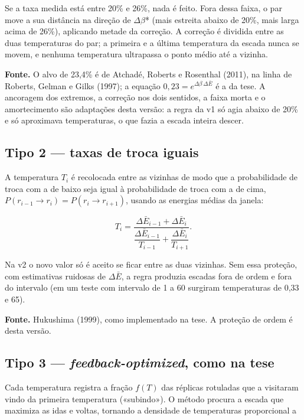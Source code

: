 \documentclass[10pt,a4paper]{article}
\begin{document}
Se a taxa medida está entre 20\% e 26\%, nada é feito. Fora dessa faixa, o par move a sua distância na direção de $\Delta \beta$* (mais estreita abaixo de 20\%, mais larga acima de 26\%), aplicando metade da correção. A correção é dividida entre as duas temperaturas do par; a primeira e a última temperatura da escada nunca se movem, e nenhuma temperatura ultrapassa o ponto médio até a vizinha.

\begin{fonte}
\textbf{Fonte.} O alvo de 23,4\% é de Atchadé, Roberts e Rosenthal (2011), na linha de Roberts, Gelman e Gilks (1997); a equação $0{,}23 = e^{\Delta\beta\,\Delta\bar{E}}$ é a da tese. A ancoragem dos extremos, a correção nos dois sentidos, a faixa morta e o amortecimento são adaptações desta versão: a regra da v1 só agia abaixo de 20\% e só aproximava temperaturas, o que fazia a escada inteira descer.
\end{fonte}

\subsection*{Tipo 2 — taxas de troca iguais}

A temperatura $T_{i}$ é recolocada entre as vizinhas de modo que a probabilidade de troca com a de baixo seja igual à probabilidade de troca com a de cima, $P(r_{i-1} \to r_i) = P(r_i \to r_{i+1})$, usando as energias médias da janela:

\[
T_i = \frac{\Delta\bar{E}_{i-1} + \Delta\bar{E}_i}{\dfrac{\Delta\bar{E}_{i-1}}{T_{i-1}} + \dfrac{\Delta\bar{E}_i}{T_{i+1}}}.
\]

Na v2 o novo valor só é aceito se ficar entre as duas vizinhas. Sem essa proteção, com estimativas ruidosas de $\Delta \bar{E}$, a regra produzia escadas fora de ordem e fora do intervalo (em um teste com intervalo de 1 a 60 surgiram temperaturas de 0,33 e 65).

\begin{fonte}
\textbf{Fonte.} Hukushima (1999), como implementado na tese. A proteção de ordem é desta versão.
\end{fonte}

\subsection*{Tipo 3 — \textit{feedback-optimized}, como na tese}

Cada temperatura registra a fração $f(T)$ das réplicas rotuladas que a visitaram vindo da primeira temperatura («subindo»). O método procura a escada que maximiza as idas e voltas, tornando a densidade de temperaturas proporcional a
\end{document}

